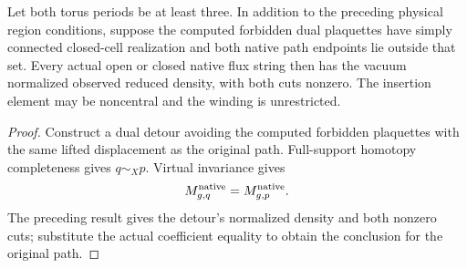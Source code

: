 \begin{lemma}
    \label{lem:peps_native_noncentral_flux_density}
    \leanok
    Let both torus periods be at least three. In addition to the preceding
    physical region conditions, suppose the
    computed forbidden dual plaquettes have simply connected closed-cell
    realization and both native path endpoints lie outside that set.
    Every actual open or closed native flux string then has the vacuum
    normalized observed reduced density, with both cuts nonzero.
    The insertion element may be noncentral and the winding is unrestricted.
\end{lemma}
\begin{proof}\leanok
    Construct a dual detour avoiding the computed forbidden plaquettes
    with the same lifted displacement as the original path. Full-support
    homotopy completeness gives $q\sim_Xp$. Virtual invariance gives
    \begin{align}
        M_{g,q}^{\rm native}=M_{g,p}^{\rm native}.
        \label{eq:peps_native_noncentral_detour_cut}
    \end{align}
    The preceding result gives the detour's
    normalized density and both nonzero cuts; substitute the actual
    coefficient equality to obtain the conclusion for the original path.
\end{proof}


